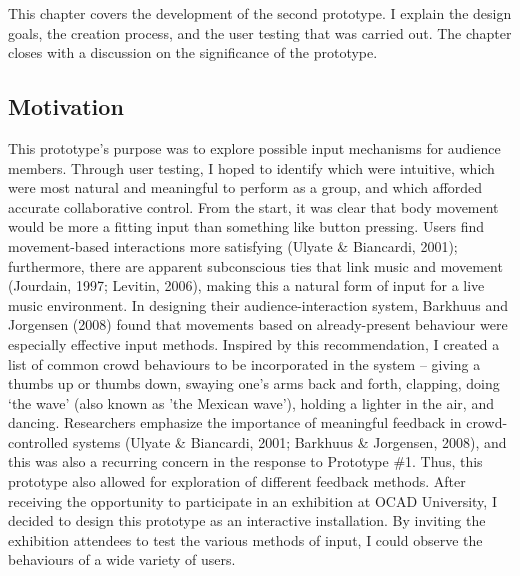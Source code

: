 This chapter covers the development of the second prototype. I explain the design goals, the creation process, and the user testing that was carried out. The chapter closes with a discussion on the significance of the prototype.

\subsection{Motivation}

This prototype's purpose was to explore possible input mechanisms for audience members. Through user testing, I hoped to identify which were intuitive, which were most natural and meaningful to perform as a group, and which afforded accurate collaborative control. From the start, it was clear that body movement would be more a fitting input than something like button pressing. Users find movement-based interactions more satisfying (Ulyate \& Biancardi, 2001); furthermore, there are apparent subconscious ties that link music and movement (Jourdain, 1997; Levitin, 2006), making this a natural form of input for a live music environment. In designing their audience-interaction system, Barkhuus and Jorgensen (2008) found that movements based on already-present behaviour were especially effective input methods. Inspired by this recommendation, I created a list of common crowd behaviours to be incorporated in the system -- giving a thumbs up or thumbs down, swaying one's arms back and forth, clapping, doing `the wave' (also known as 'the Mexican wave'), holding a lighter in the air, and dancing. Researchers emphasize the importance of meaningful feedback in crowd-controlled systems (Ulyate \& Biancardi, 2001; Barkhuus \& Jorgensen, 2008), and this was also a recurring concern in the response to Prototype \#1. Thus, this prototype also allowed for exploration of different feedback methods. After receiving the opportunity to participate in an exhibition at OCAD University, I decided to design this prototype as an interactive installation. By inviting the exhibition attendees to test the various methods of input, I could observe the behaviours of a wide variety of users.

